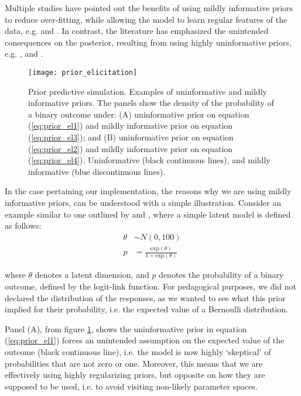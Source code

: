 Multiple studies have pointed out the benefits of using mildly informative priors to reduce over-fitting, while allowing the model to learn regular features of the data, e.g. \citet{McElreath_2020, Gelman_et_al_1996b} and \citet{Jaynes_1985}. In contrast, the literature has emphasized the unintended consequences on the posterior, resulting from using highly uninformative priors, e.g. \citet{Seaman_et_al_2012}, and \citet{Gelman_1996}. 
%
\begin{figure}[!h]
	\centering
	\texttt{[image: prior\_elicitation]}
	\caption[Prior predictive simulation. Examples of uninformative and mildly informative priors.]%
	{Prior predictive simulation. Examples of uninformative and mildly informative priors. The panels show the density of the probability of a binary outcome under: (A) uninformative prior on equation (\ref{eq:prior_el1}) and mildly informative prior on equation (\ref{eq:prior_el3}); and (B) uninformative prior on equation (\ref{eq:prior_el2}) and mildly informative prior on equation (\ref{eq:prior_el4}). Uninformative (black continuous lines), and mildly informative (blue discontinuous lines).}
	\label{fig:prior_elicitation}
\end{figure}

In the case pertaining our implementation, the reasons why we are using mildly informative priors, can be understood with a simple illustration. Consider an example similar to one outlined by \citet{Seaman_et_al_2012} and \citet{McElreath_2020}, where a simple latent model is defined as follows:
%
\begin{equation} \label{eq:prior_el1}
	\begin{split}	
		\theta &\sim N(0, 100) \\
		p &= \frac{ \text{exp}(\theta) }{ 1 + \text{exp}(\theta) }
	\end{split}
\end{equation}

\noindent where $\theta$ denotes a latent dimension, and $p$ denotes the probability of a binary outcome, defined by the logit-link function. For pedagogical purposes, we did not declared the distribution of the responses, as we wanted to see what this prior implied for their probability, i.e. the expected value of a Bernoulli distribution.

Panel (A), from figure \ref{fig:prior_elicitation}, shows the uninformative prior in equation (\ref{eq:prior_el1}) forces an unintended assumption on the expected value of the outcome (black continuous line), i.e. the model is now highly `skeptical' of probabilities that are not zero or one. Moreover, this means that we are effectively using highly regularizing priors, but opposite on how they are supposed to be used, i.e. to avoid visiting non-likely parameter spaces.

